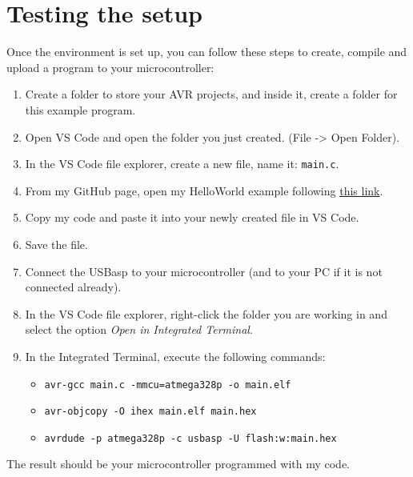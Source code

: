 \documentclass[10pt,letterpaper]{article}
\begin{document}
\section{Testing the setup}
Once the environment is set up, you can follow these steps to create, compile and upload a program to your microcontroller:
\begin{enumerate}
    \item Create a folder to store your AVR projects, and inside it, create a folder for this example program.
    \item Open VS Code and open the folder you just created. (File -> Open Folder).
    \item In the VS Code file explorer, create a new file, name it: {\color{ForestGreen}\texttt{main.c}}.
    \item From my GitHub page, open my HelloWorld example following \href{https://github.com/dagmtz/I7266/blob/master/001_Assets/004_Examples/mega328P/001_HelloWorld/main.c}{this link}.
    \item Copy my code and paste it into your newly created file in VS Code.
    \item Save the file.
    \item Connect the USBasp to your microcontroller (and to your PC if it is not connected already).
    \item In the VS Code file explorer, right-click the folder you are working in and select the option \textit{Open in Integrated Terminal}.
    \item In the Integrated Terminal, execute the following commands: 
    \begin{itemize}
        \item \texttt{avr-gcc main.c -mmcu=atmega328p -o main.elf}
        \item \texttt{avr-objcopy -O ihex main.elf main.hex}
        \item \texttt{avrdude -p atmega328p -c usbasp -U flash:w:main.hex}
    \end{itemize}
\end{enumerate}
The result should be your microcontroller programmed with my code.
\end{document}
